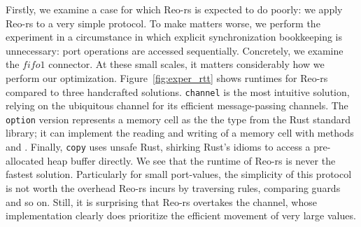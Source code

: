 Firstly, we examine a case for which Reo-rs is expected to do poorly: we apply Reo-rs to a very simple protocol. To make matters worse, we perform the experiment in a circumstance in which explicit synchronization bookkeeping is unnecessary: port operations are accessed sequentially.
Concretely, we examine the $fifo1$ connector. At these small scales, it matters considerably how we perform our optimization. Figure~\ref{fig:exper_rtt} shows runtimes for Reo-rs compared to three handcrafted solutions. \texttt{channel} is the most intuitive solution, relying on the ubiquitous  channel for its efficient message-passing channels. The \texttt{option} version represents a memory cell as the the  type from the Rust standard library; it can implement the reading and writing of a memory cell with methods  and . Finally, \texttt{copy} uses unsafe Rust, shirking Rust's idioms to access a pre-allocated heap buffer directly. We see that the runtime of Reo-rs is never the fastest solution. Particularly for small port-values, the simplicity of this protocol is not worth the overhead Reo-rs incurs by traversing rules, comparing guards and so on. Still, it is surprising that Reo-rs overtakes the  channel, whose implementation clearly does prioritize the efficient movement of very large values.

